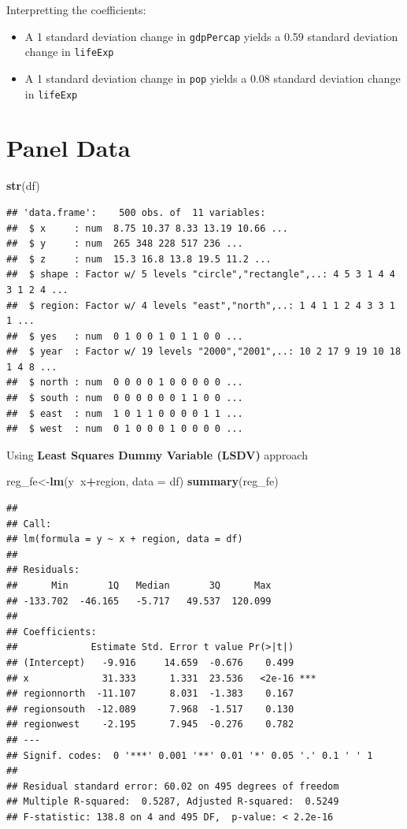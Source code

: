 \documentclass[]{book}
\newenvironment{Shaded}{\begin{snugshade}}{\end{snugshade}}
\newcommand{\KeywordTok}[1]{\textcolor[rgb]{0.13,0.29,0.53}{\textbf{#1}}}
\newcommand{\DataTypeTok}[1]{\textcolor[rgb]{0.13,0.29,0.53}{#1}}
\newcommand{\OperatorTok}[1]{\textcolor[rgb]{0.81,0.36,0.00}{\textbf{#1}}}
\newcommand{\NormalTok}[1]{#1}
\providecommand{\tightlist}{%
  \setlength{\itemsep}{0pt}\setlength{\parskip}{0pt}}
\theoremstyle{definition}
\theoremstyle{definition}
\theoremstyle{definition}
\theoremstyle{remark}
\begin{document}
Interpretting the coefficients:

\begin{itemize}
\tightlist
\item
  A 1 standard deviation change in \texttt{gdpPercap} yields a 0.59
  standard deviation change in \texttt{lifeExp}
\item
  A 1 standard deviation change in \texttt{pop} yields a 0.08 standard
  deviation change in \texttt{lifeExp}
\end{itemize}

\section{Panel Data}\label{panel-data}

\begin{Shaded}
\begin{Highlighting}[]
\KeywordTok{str}\NormalTok{(df)}
\end{Highlighting}
\end{Shaded}

\begin{verbatim}
## 'data.frame':    500 obs. of  11 variables:
##  $ x     : num  8.75 10.37 8.33 13.19 10.66 ...
##  $ y     : num  265 348 228 517 236 ...
##  $ z     : num  15.3 16.8 13.8 19.5 11.2 ...
##  $ shape : Factor w/ 5 levels "circle","rectangle",..: 4 5 3 1 4 4 3 1 2 4 ...
##  $ region: Factor w/ 4 levels "east","north",..: 1 4 1 1 2 4 3 3 1 1 ...
##  $ yes   : num  0 1 0 0 1 0 1 1 0 0 ...
##  $ year  : Factor w/ 19 levels "2000","2001",..: 10 2 17 9 19 10 18 1 4 8 ...
##  $ north : num  0 0 0 0 1 0 0 0 0 0 ...
##  $ south : num  0 0 0 0 0 0 1 1 0 0 ...
##  $ east  : num  1 0 1 1 0 0 0 0 1 1 ...
##  $ west  : num  0 1 0 0 0 1 0 0 0 0 ...
\end{verbatim}

Using \textbf{Least Squares Dummy Variable (LSDV)} approach

\begin{Shaded}
\begin{Highlighting}[]
\NormalTok{reg_fe<-}\KeywordTok{lm}\NormalTok{(y}\OperatorTok{~}\NormalTok{x}\OperatorTok{+}\NormalTok{region, }\DataTypeTok{data =}\NormalTok{ df)}
\KeywordTok{summary}\NormalTok{(reg_fe)}
\end{Highlighting}
\end{Shaded}

\begin{verbatim}
## 
## Call:
## lm(formula = y ~ x + region, data = df)
## 
## Residuals:
##      Min       1Q   Median       3Q      Max 
## -133.702  -46.165   -5.717   49.537  120.099 
## 
## Coefficients:
##             Estimate Std. Error t value Pr(>|t|)    
## (Intercept)   -9.916     14.659  -0.676    0.499    
## x             31.333      1.331  23.536   <2e-16 ***
## regionnorth  -11.107      8.031  -1.383    0.167    
## regionsouth  -12.089      7.968  -1.517    0.130    
## regionwest    -2.195      7.945  -0.276    0.782    
## ---
## Signif. codes:  0 '***' 0.001 '**' 0.01 '*' 0.05 '.' 0.1 ' ' 1
## 
## Residual standard error: 60.02 on 495 degrees of freedom
## Multiple R-squared:  0.5287, Adjusted R-squared:  0.5249 
## F-statistic: 138.8 on 4 and 495 DF,  p-value: < 2.2e-16
\end{verbatim}
\end{document}
